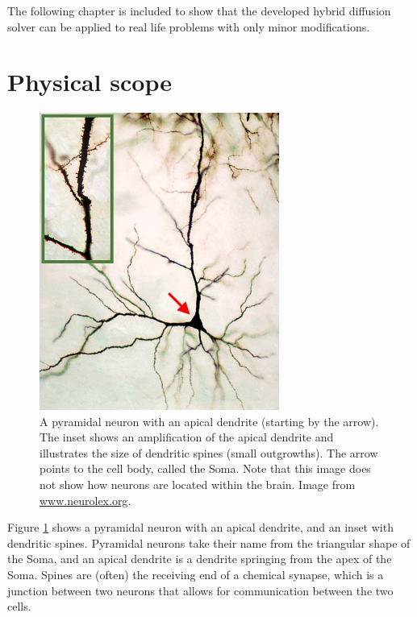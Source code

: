 The following chapter is included to show that the developed hybrid diffusion solver can be applied to real life problems with only minor modifications.

\section{Physical scope}

\begin{figure}[H]
 \centering
 \includegraphics[width=0.7\textwidth]{Figures/Cochlear_nucleus_multipolar_cell.jpg}
 \caption[Pyramidal neuron]{A pyramidal neuron with an apical dendrite (starting by the arrow). The inset shows an amplification of the apical dendrite and illustrates the size of dendritic spines (small outgrowths). The arrow points to the cell body, called the Soma. Note that this image does not show how neurons are located within the brain. Image from \url{www.neurolex.org}.}
 \label{application:pyramidal_neuron}
\end{figure}

Figure \ref{application:pyramidal_neuron} shows a pyramidal neuron with an apical dendrite, and an inset with dendritic spines. 
Pyramidal neurons take their name from the triangular shape of the Soma, and an apical dendrite is a dendrite springing from the apex of the Soma. 
Spines are (often) the receiving end of a chemical synapse, which is a junction between two neurons that allows for communication between the two cells. \\

